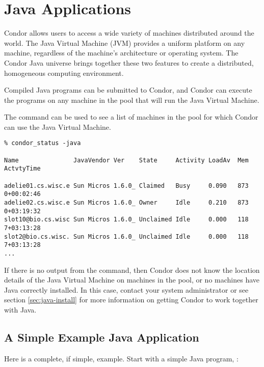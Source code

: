 
\section{\label{sec:Java}Java Applications}

Condor allows users to access a wide variety of
machines distributed around the world.
The Java Virtual Machine (JVM)
provides a uniform platform on any machine, regardless of the
machine's architecture or operating system.
The Condor Java universe brings together these
two features to create a distributed, homogeneous computing environment.

Compiled Java programs can be submitted to Condor, and Condor
can execute the programs on any machine in the pool that will run
the Java Virtual Machine.


The  command can be used to see a list of
machines in the pool for which Condor can use the Java Virtual
Machine.

\footnotesize
\begin{verbatim}
% condor_status -java

Name               JavaVendor Ver    State     Activity LoadAv  Mem  ActvtyTime

adelie01.cs.wisc.e Sun Micros 1.6.0_ Claimed   Busy     0.090   873  0+00:02:46
adelie02.cs.wisc.e Sun Micros 1.6.0_ Owner     Idle     0.210   873  0+03:19:32
slot10@bio.cs.wisc Sun Micros 1.6.0_ Unclaimed Idle     0.000   118  7+03:13:28
slot2@bio.cs.wisc. Sun Micros 1.6.0_ Unclaimed Idle     0.000   118  7+03:13:28
...
\end{verbatim}
\normalsize

If there is no output from the
 command,
then Condor does not know the location details of the Java Virtual
Machine on machines in the pool,
or no machines have Java correctly installed.
In this case,
contact your system administrator or see section \ref{sec:java-install}
for more information on getting Condor to work together
with Java.

\subsection{A Simple Example Java Application}

Here is a complete, if simple, example.
Start with a simple Java program, :


